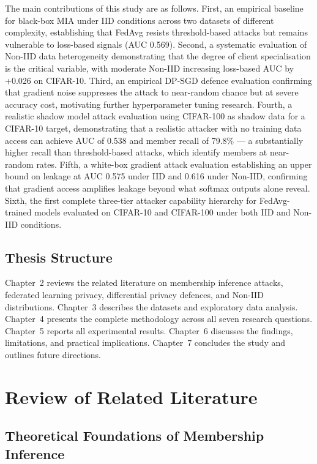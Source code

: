 \documentclass[12pt, a4paper]{report}
\begin{document}
The main contributions of this study are as follows. First, an empirical baseline
for black-box MIA under IID conditions across two datasets of different complexity,
establishing that FedAvg resists threshold-based attacks but remains vulnerable
to loss-based signals (AUC 0.569). Second, a systematic evaluation of Non-IID data
heterogeneity demonstrating that the degree of client specialisation is the
critical variable, with moderate Non-IID increasing loss-based AUC by +0.026 on
CIFAR-10. Third, an empirical DP-SGD defence evaluation confirming that gradient
noise suppresses the attack to near-random chance but at severe accuracy cost,
motivating further hyperparameter tuning research. Fourth, a realistic shadow
model attack evaluation using CIFAR-100 as shadow data for a CIFAR-10 target,
demonstrating that a realistic attacker with no training data access can achieve
AUC of 0.538 and member recall of 79.8\% --- a substantially higher recall than
threshold-based attacks, which identify members at near-random rates. Fifth, a white-box gradient attack evaluation
establishing an upper bound on leakage at AUC 0.575 under IID and 0.616 under
Non-IID, confirming that gradient access amplifies leakage beyond what softmax
outputs alone reveal. Sixth, the first complete three-tier attacker capability
hierarchy for FedAvg-trained models evaluated on CIFAR-10 and CIFAR-100 under
both IID and Non-IID conditions.

\section{Thesis Structure}

Chapter~2 reviews the related literature on membership inference attacks,
federated learning privacy, differential privacy defences, and Non-IID
distributions. Chapter~3 describes the datasets and exploratory data analysis.
Chapter~4 presents the complete methodology across all seven research questions.
Chapter~5 reports all experimental results. Chapter~6 discusses the findings,
limitations, and practical implications. Chapter~7 concludes the study and
outlines future directions.

\chapter{Review of Related Literature}

\section{Theoretical Foundations of Membership Inference}
\end{document}
